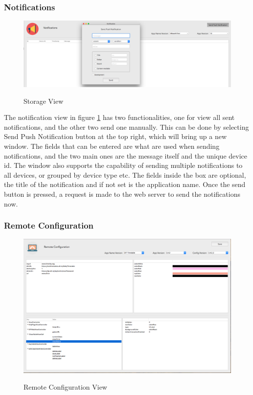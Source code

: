 \subsubsection{Notifications}

\begin{figure}[. !h]
    \caption{Storage View}
    \centering
    \includegraphics[width=120mm]{images/dashboard/notifications}
    \label{fig:notification}
\end{figure}

The notification view in figure \ref{fig:notification} has two functionalities, one for view all sent notifications, and the other two send one manually. This can be done by selecting Send Push Notification button at the top right, which will bring up a new window. The fields that can be entered are what are used when sending notifications, and the two main ones are the message itself and the unique device id. The window also supports the capability of sending multiple notifications to all devices, or grouped by device type etc. The fields inside the box are optional, the title of the notification and if not set is the application name. Once the send button is pressed, a request is made to the web server to send the notifications now.

\subsubsection{Remote Configuration}

\begin{figure}[!h]
    \caption{Remote Configuration View}
    \centering
    \includegraphics[width=150mm]{images/dashboard/remote-config}
    \label{fig:remote-config-view}
\end{figure}

